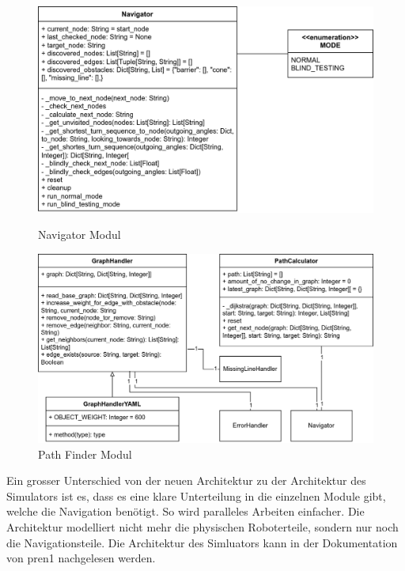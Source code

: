 \begin{figure}[H]
  \centering
    \begin{minipage}[b]{0.48\textwidth}
    \centering
    \includegraphics[width=\textwidth]{assets/IT/robot-sw-architecture-navigator.png}
    \caption{Navigator Modul}
    \label{fig:nav-navigator}
  \end{minipage}
  \hfill
  \begin{minipage}[b]{0.48\textwidth}
    \centering
    \includegraphics[width=\textwidth]{assets/IT/robot-sw-architecture-path_finder.png}
    \caption{Path Finder Modul}
    \label{fig:nav-pathfinder}
  \end{minipage}
\end{figure}

Ein grosser Unterschied von der neuen Architektur zu der Architektur des Simulators ist es, dass es eine klare Unterteilung in die einzelnen Module gibt, welche die Navigation benötigt. So wird paralleles Arbeiten einfacher. Die Architektur modelliert nicht mehr die physischen Roboterteile, sondern nur noch die Navigationsteile. Die Architektur des Simluators kann in der Dokumentation von \acrshort{pren1} nachgelesen werden.

